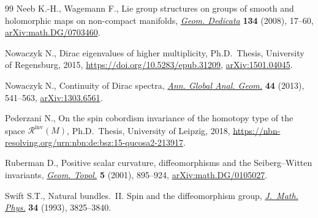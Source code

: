 \documentclass[pdftex]{sigma}
\newcommand\<{\langle}
\renewcommand\>{\rangle}
\theoremstyle{definition}
\newcommand\={\,=\,}
\numberwithin{equation}{section}
\begin{document}
\begin{thebibliography}{99}
Neeb K.-H., Wagemann F., Lie group structures on groups of smooth and
 holomorphic maps on non-compact manifolds,
 \href{https://doi.org/10.1007/s10711-008-9244-2}{\textit{Geom. Dedicata}}
 \textbf{134} (2008), 17--60,
 \href{http://arxiv.org/abs/math.DG/0703460}{arXiv:math.DG/0703460}.

Nowaczyk N., Dirac eigenvalues of higher multiplicity, Ph.D.~Thesis,
 {U}niversity of Regensburg, 2015, \url{https://doi.org/10.5283/epub.31209},
 \href{http://arxiv.org/abs/1501.04045}{arXiv:1501.04045}.

Nowaczyk N., Continuity of {D}irac spectra,
 \href{https://doi.org/10.1007/s10455-013-9381-1}{\textit{Ann. Global Anal.
 Geom.}} \textbf{44} (2013), 541--563,
 \href{http://arxiv.org/abs/1303.6561}{arXiv:1303.6561}.

Pederzani N., On the spin cobordism invariance of the homotopy type of the
 space {$\mathcal{R}^{\mathrm{inv}}(M)$}, Ph.D.~Thesis, {U}niversity of
 Leipzig, 2018,
 \url{https://nbn-resolving.org/urn:nbn:de:bsz:15-qucosa2-213917}.

Ruberman D., Positive scalar curvature, diffeomorphisms and the
 {S}eiberg--{W}itten invariants,
 \href{https://doi.org/10.2140/gt.2001.5.895}{\textit{Geom. Topol.}}
 \textbf{5} (2001), 895--924,
 \href{http://arxiv.org/abs/math.DG/0105027}{arXiv:math.DG/0105027}.

Swift S.T., Natural bundles.~{II}. {S}pin and the diffeomorphism group,
 \href{https://doi.org/10.1063/1.530009}{\textit{J.~Math. Phys.}} \textbf{34}
 (1993), 3825--3840.

\end{thebibliography}\LastPageEnding
\end{document}

